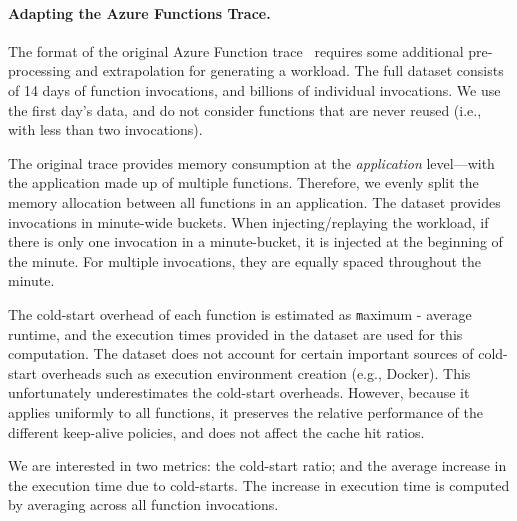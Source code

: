 \paragraph{Adapting the Azure Functions Trace.}
The format of the original Azure Function trace~\cite{shahrad_serverless_2020} requires some additional pre-processing and extrapolation for generating a workload.  
The full dataset consists of 14 days of function invocations, and billions of individual invocations. We use the first day's data, and do not consider functions that are never reused (i.e., with less than two invocations). 

The original trace provides memory consumption at the \textit{application} level---with the application made up of multiple functions.
Therefore, we evenly split the memory allocation between all functions in an application.
The dataset provides invocations in minute-wide buckets.
When injecting/replaying the workload, if there is only one invocation in a minute-bucket, it is injected at the beginning of the minute. 
For multiple invocations, they are equally spaced throughout the minute. 

%
The cold-start overhead of each function is estimated as {\texttt maximum - average} runtime, and the execution times provided in the dataset are used for this computation. 
The dataset does not account for certain important sources of cold-start overheads such as execution environment creation (e.g., Docker).
This unfortunately underestimates the cold-start overheads.
However, because it applies uniformly to all functions, it preserves the relative performance of the different keep-alive policies, and does not affect the cache hit ratios. 
%



We are interested in two metrics: the cold-start ratio; and the average increase in the execution time due to cold-starts.
The increase in execution time is computed by averaging across all function invocations. 



